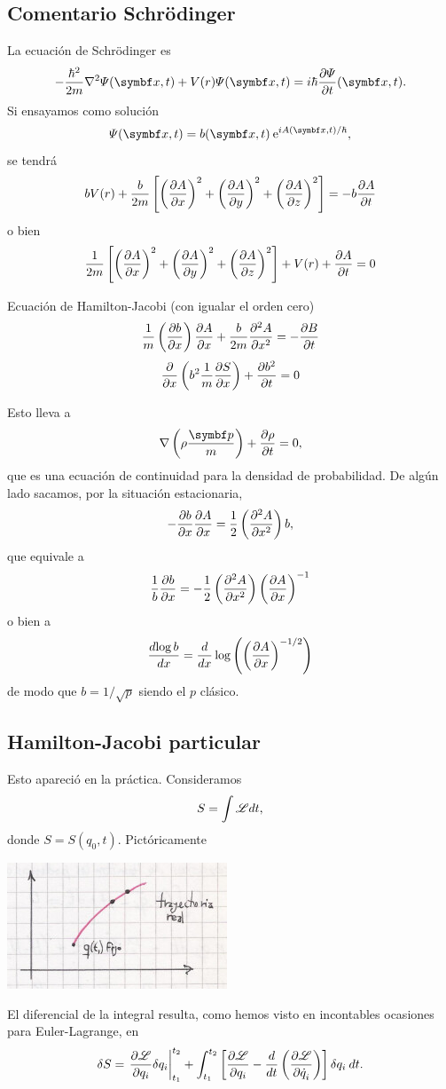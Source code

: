 \documentclass[10pt,oneside]{CBFT_book}
\begin{document}
\subsection{Comentario Schrödinger}

La ecuación de Schrödinger es
\[
	- \frac{\hbar^2}{2m} \nabla^2 \Psi(\vb{x},t) + V(r) \Psi(\vb{x},t) = i \hbar  \dpar{\Psi}{t} (\vb{x},t).
\]
Si ensayamos como solución 
\[
	\Psi(\vb{x},t) = b(\vb{x},t)  \euler^{i A(\vb{x},t) / \hbar},
\]
se tendrá 
\[
	b V(r) + \frac{b}{2m} \left[ \Dpar{A}{x}^2 + \Dpar{A}{y}^2 + \Dpar{A}{z}^2 \right] = - b \dpar{A}{t}
\]
o bien 
\[
	\frac{1}{2m} \left[ \Dpar{A}{x}^2 + \Dpar{A}{y}^2 + \Dpar{A}{z}^2 \right] + V(r) + \dpar{A}{t} = 0
\]

Ecuación de Hamilton-Jacobi (con igualar el orden cero)
\[
	\frac{1}{m} \Dpar{b}{x} \dpar{A}{x} + \frac{b}{2m} \dpar[2]{A}{x} = - \dpar{B}{t}
\]
\[
	\dpar{}{x}\left( b^2 \frac{1}{m} \dpar{S}{x} \right) + \dpar{b^2}{t} = 0
\]

Esto lleva a 
\[
	\nabla \left( \rho \frac{\vb{p}}{m} \right) + \dpar{\rho}{t} = 0,
\]
que es una ecuación de continuidad para la densidad de probabilidad.
De algún lado sacamos, por la situación estacionaria,
\[
	- \dpar{b}{x} \dpar{A}{x} = \frac{1}{2} \Dpar[2]{A}{x} b,
\]
que equivale a 
\[
	\frac{1}{b} \dpar{b}{x} = - \frac 1 2 \Dpar[2]{A}{x} \Dpar{A}{x}^{-1}
\]
o bien a 
\[
	\dtot{\log b}{x} = \dtot{}{x} \log\left( \Dpar{A}{x}^{-1/2} \right)
\]
de modo que $b = 1 / \sqrt{p}$ siendo el $p$ clásico.


\subsection{Hamilton-Jacobi particular}

Esto apareció en la práctica. Consideramos
\[
	S = \int \Lag dt,
\]
donde $S = S(q_0,t)$. Pictóricamente

\includegraphics[scale=0.5]{images/fig_mc_ham-jac_1.jpg}

El diferencial de la integral resulta, como hemos visto en incontables ocasiones para Euler-Lagrange, en
\[
	\delta S = \left. \dpar{ \Lag }{ q_i } \delta q_i \right|_{t_1}^{t_2} + 
	\int_{t_1}^{t_2} \left[ \dpar{ \Lag }{ q_i } - \dtot{}{t}\Dpar{\Lag}{\dot{q}_i} \right] \delta q_i \: dt. 
\]
\end{document}
